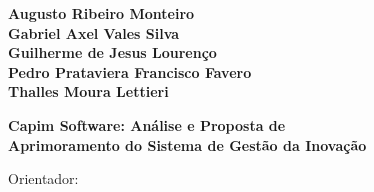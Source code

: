 \begin{folhaderosto}
  \begin{center}
    {\ABNTEXchapterfont\bfseries\large Augusto Ribeiro Monteiro\\
    Gabriel Axel Vales Silva\\
    Guilherme de Jesus Lourenço\\
    Pedro Prataviera Francisco Favero\\
    Thalles Moura Lettieri}
    \vspace*{\fill}

    {\ABNTEXchapterfont\bfseries\large Capim Software: Análise e Proposta de\\Aprimoramento do Sistema de Gestão da Inovação}
    \vspace*{\fill}

    \hspace{.45\textwidth}
    \begin{minipage}{.5\textwidth}
      \SingleSpacing\imprimirpreambulo
      \par\vspace{1em}
      Orientador: \imprimirorientador
    \end{minipage}
    \vspace*{\fill}

    {\large\imprimirlocal}\\{\large\imprimirdata}
    \vspace*{1cm}
  \end{center}
\end{folhaderosto}
